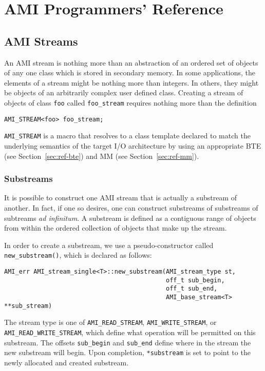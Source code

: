 \chapter{AMI Programmers' Reference}

\section{AMI Streams}
\label{sec:ami_stream-ref}

An AMI stream is nothing more than an abstraction
of an ordered set of objects of any one class which is stored in
secondary memory.  In some applications, the elements of a stream
might be nothing more than integers.  In others, they might be objects
of an arbitrarily complex user defined class.  Creating a stream of
objects of class \verb|foo| called \verb|foo_stream| requires nothing
more than the definition

\begin{verbatim}
AMI_STREAM<foo> foo_stream;
\end{verbatim}

\verb|AMI_STREAM| is a macro that resolves to a class
template declared to match the underlying semantics of the target I/O
architecture by using an appropriate BTE
(see Section~\ref{sec:ref-bte}) and MM 
(see Section~\ref{sec:ref-mm}).


\subsection{Substreams}

It is possible to construct one AMI stream that is actually a
substream of another.  In fact, if one so desires, one can construct
substreams of substreams of subtreams {\em ad infinitum}.  A substream
is defined as a contiguous range of objects from within the ordered
collection of objects that make up the stream.

In order to create a substream, we use a pseudo-constructor called
\verb|new_substream()|, which is declared as follows:
\begin{verbatim}
AMI_err AMI_stream_single<T>::new_substream(AMI_stream_type st,
                                            off_t sub_begin,
                                            off_t sub_end,
                                            AMI_base_stream<T> **sub_stream)
\end{verbatim}
The stream type is one of \verb|AMI_READ_STREAM|,
\verb|AMI_WRITE_STREAM|, or \verb|AMI_READ_WRITE_STREAM|, which define
what operation will be permitted on this substream.  The offsets
\verb|sub_begin| and \verb|sub_end| define where in the stream the new
substream will begin.  Upon completion, \verb|*substream| is set to
point to the newly allocated and created substream.

